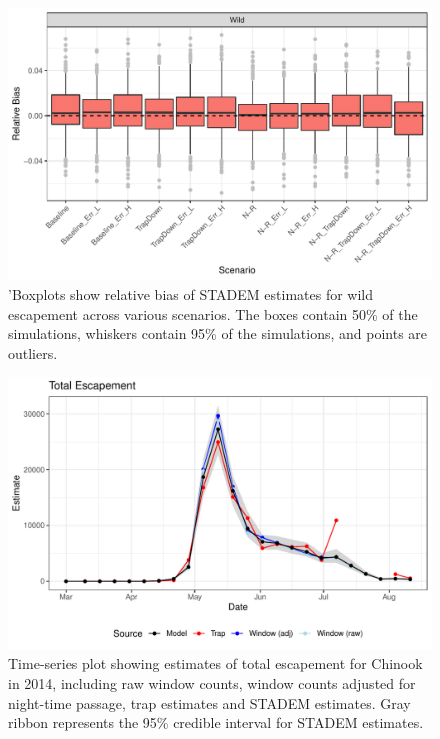 \documentclass[
  12pt,
]{article}
\begin{document}
\begin{figure}
\centering
\includegraphics{../figures/rel-bias-lgd-1.pdf}
\caption{\label{fig:rel-bias-lgd}'Boxplots show relative bias of STADEM estimates for wild escapement across various scenarios. The boxes contain 50\% of the simulations, whiskers contain 95\% of the simulations, and points are outliers.}
\end{figure}

\begin{figure}
\centering
\includegraphics{../figures/jags-fit-fig-1.pdf}
\caption{\label{fig:jags-fit-fig}Time-series plot showing estimates of total escapement for Chinook in 2014, including raw window counts, window counts adjusted for night-time passage, trap estimates and STADEM estimates. Gray ribbon represents the 95\% credible interval for STADEM estimates.}
\end{figure}
\end{document}
